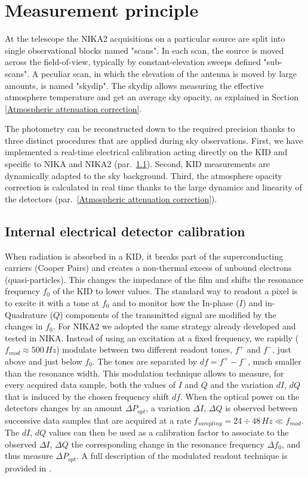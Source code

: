 \documentclass[]{aa} %
\begin{document}
\section{Measurement principle}

At the telescope the NIKA2 acquisitions on a particular source are split into single observational blocks named "scans". In each scan, the source is moved across the field-of-view, typically by constant-elevation sweeps defined "sub-scans". A peculiar scan, in which the elevation of the antenna is moved by large amounts, is named "skydip". The skydip allows measuring the effective atmosphere temperature and get an average sky opacity, as explained in Section \ref{Atmospheric attenuation correction}.

The photometry can be reconstructed down to the required precision thanks to three distinct procedures that are applied during sky observations. First, we have implemented a real-time electrical calibration acting directly on the KID and specific to NIKA and NIKA2 (par.~\ref{Internal detectors calibration}). Second, KID measurements are dynamically adapted to the sky background. Third, the atmosphere opacity correction is calculated in real time thanks to the large dynamics and linearity of the detectors (par.~\ref{Atmospheric attenuation correction}).



\subsection{Internal electrical detector calibration}
\label{Internal detectors calibration}
When radiation is absorbed in a KID, it breaks part of the superconducting carriers (Cooper Pairs) and creates a non-thermal excess of unbound electrons (quasi-particles). This changes the impedance of the film and shifts the resonance frequency $f_0$ of the KID to lower values.
The standard way to readout a pixel is to excite it with a tone at $f_0$ and to monitor how the In-phase ($I$) and in-Quadrature ($Q$) components of the transmitted signal are modified by the changes in $f_0$. For NIKA2 we adopted the same strategy already developed and tested in NIKA. Instead of using an excitation at a fixed frequency, we rapidly ($f_{mod} \approx 500\,Hz$) modulate between two different readout tones, $f^+$ and $f^-$, just above and just below $f_0$. The tones are separated by $df=f^+-f^-$, much smaller than the resonance width. This modulation technique allows to measure, for every acquired data sample, both the values of $I$ and $Q$ and the variation $dI$, $dQ$ that is induced by the chosen frequency shift $df$. When the optical power on the detectors changes by an amount $\Delta P_{opt}$, a variation $\Delta I$, $\Delta Q$ is observed between successive data samples that are acquired at a rate $f_{sampling} = 24\div48\,Hz \ll  f_{mod} $. The $dI$, $dQ$ values can then be used as a calibration factor to associate to the observed $\Delta I$, $\Delta Q$ the corresponding change in the resonance frequency $\Delta f_0$, and thus measure $\Delta P_{opt}$. A full description of the modulated readout technique is provided in \cite{Calvo2013}.
\end{document}
